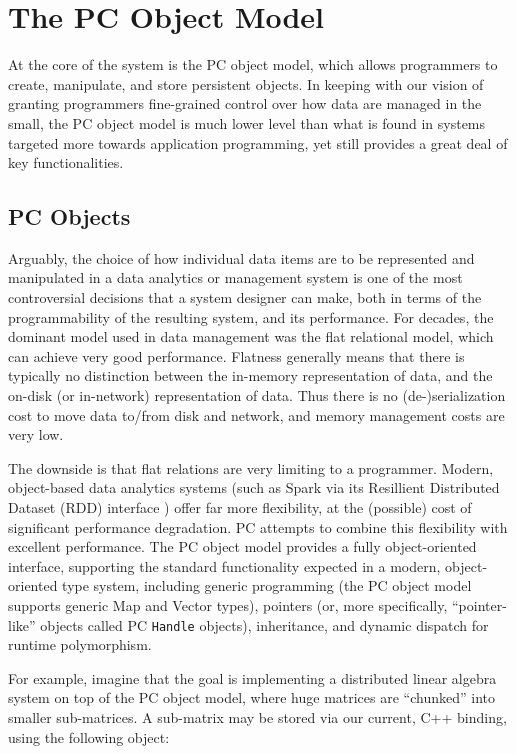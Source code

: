 \section{The PC Object Model} \label{sec:ObjectModel}

At the core of the system is the PC object model, which allows 
programmers to create, manipulate, and store persistent objects.
In keeping with our vision of granting programmers fine-grained control over how data are managed in the small, the PC object model
is much lower level than what is found in systems targeted more towards application programming, yet still provides a great deal of
key functionalities.

\subsection{PC Objects}

Arguably, the choice of how individual data items are to be represented and manipulated
in a data analytics or management system is one of the most
controversial decisions
that a system designer can make, both in terms of 
the programmability of the resulting system, and its performance.  For decades, the dominant model used in
data management was the flat relational model, which 
can achieve very good performance.
Flatness generally means 
that there is typically no distinction between the in-memory representation of data, and the on-disk (or in-network) representation of
data. Thus there is no (de-)serialization cost to move data to/from
disk and network, and memory management costs are very low. 

The downside is that flat relations are very limiting to a programmer.  Modern, object-based 
data analytics systems 
(such as Spark via its Resillient Distributed Dataset (RDD) interface \cite{zaharia2012resilient}) offer far more flexibility, at the (possible) cost of significant performance degradation.  
PC attempts to combine this flexibility with excellent performance.
The PC object model provides a fully object-oriented interface, supporting the standard functionality expected in a modern, object-oriented type system,
including generic programming (the PC object model supports generic Map and Vector types), pointers (or, more specifically,
``pointer-like'' objects called PC \texttt{Handle} objects), inheritance, and dynamic dispatch for runtime polymorphism.  

For example, imagine that the goal is implementing a distributed linear algebra system on top of the PC object model, where huge matrices are ``chunked'' into
smaller sub-matrices.  A sub-matrix may be stored via our current, C++ binding, using the following object:

